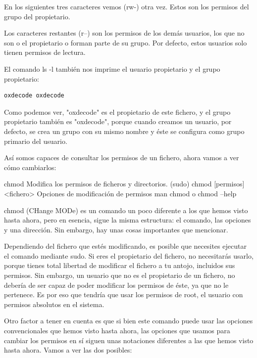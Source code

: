 En los siguientes tres caracteres vemos (rw-) otra vez. Estos son los permisos del grupo del propietario.

Los caracteres restantes (r--) son los permisos de los demás usuarios, los que no son o el propietario o forman parte de su grupo. Por defecto, estos usuarios solo tienen permisos de lectura.

El comando ls -l también nos imprime el usuario propietario y el grupo propietario:

\begin{tcolorbox-code}
\begin{lstlisting}
oxdecode oxdecode
\end{lstlisting}
\end{tcolorbox-code}

Como podemos ver, "oxdecode" es el propietario de este fichero, y el grupo propietario también es "oxdecode", porque cuando creamos un usuario, por defecto, se crea un grupo con su mismo nombre y éste se configura como grupo primario del usuario.

Así somos capaces de consultar los permisos de un fichero, ahora vamos a ver cómo cambiarlos:

\begin{command-info}
{chmod}
{Modifica los permisos de ficheros y directorios.}
{(sudo) chmod [permisos] <fichero>}
{Opciones de modificación de permisos}
{man chmod o chmod --help}
\end{command-info}

chmod (CHange MODe) es un comando un poco diferente a los que hemos visto hasta ahora, pero en esencia, sigue la misma estructura: el comando, las opciones y una dirección. Sin embargo, hay unas cosas importantes que mencionar.

Dependiendo del fichero que estés modificando, es posible que necesites ejecutar el comando mediante sudo. Si eres el propietario del fichero, no necesitarás usarlo, porque tienes total libertad de modificar el fichero a tu antojo, incluidos sus permisos. Sin embargo, un usuario que no es el propietario de un fichero, no debería de ser capaz de poder modificar los permisos de éste, ya que no le pertenece. Es por eso que tendría que usar los permisos de root, el usuario con permisos absolutos en el sistema.

Otro factor a tener en cuenta es que si bien este comando puede usar las opciones convencionales que hemos visto hasta ahora, las opciones que usamos para cambiar los permisos en sí siguen unas notaciones diferentes a las que hemos visto hasta ahora. Vamos a ver las dos posibles:

